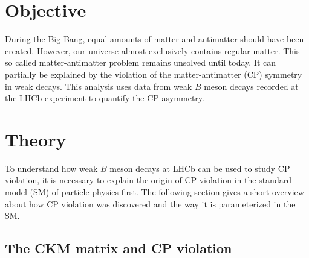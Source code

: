 \section{Objective}

During the Big Bang, equal amounts of matter and antimatter should have been created. However, our universe almost exclusively contains regular matter.
This so called matter-antimatter problem remains unsolved until today. It can partially be explained by the violation of
the matter-antimatter (CP) symmetry in weak decays. This analysis uses data from weak $B$ meson decays recorded at the LHCb experiment to quantify
the CP asymmetry.

\section{Theory}
\label{sec:Theorie}

To understand how weak $B$ meson decays at LHCb can be used to study CP violation, it is necessary to explain the origin of CP violation in the standard model (SM)
of particle physics first. The following section gives a short overview about how CP violation was discovered and the way it is parameterized in the SM.

\subsection{The CKM matrix and CP violation}


